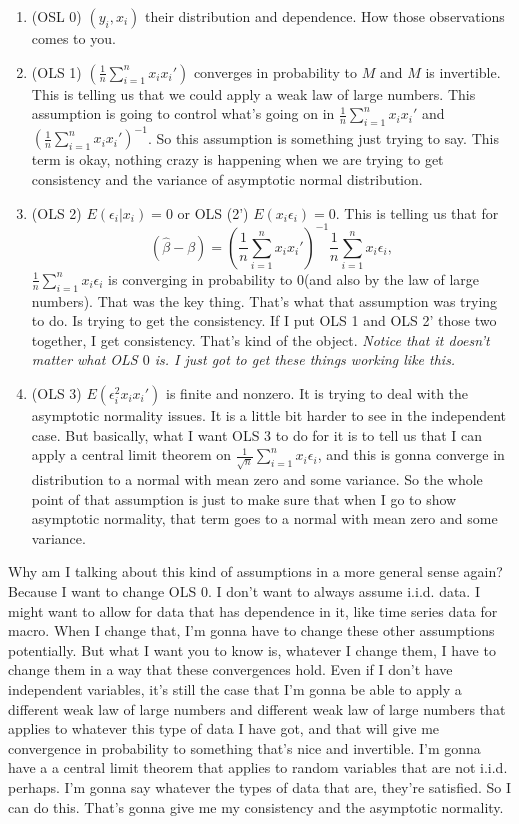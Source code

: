 \documentclass[11pt,a4paper]{amsart}
\theoremstyle{plain}
\theoremstyle{definition}
\begin{document}
	   		 \begin{enumerate}
	   		 	\item (OSL 0) $(y_{i},x_{i})$ their distribution and dependence. How those observations comes to you.
	   		 	\item (OLS 1) $(\frac{1}{n}\sum_{i=1}^{n} x_{i}x_{i}')$ converges in probability to $M$ and $M$ is invertible. This is telling us that we could apply a weak law of large numbers. This assumption is going to control what's going on in $\frac{1}{n}\sum_{i=1}^{n} x_{i}x_{i}'$ and $(\frac{1}{n}\sum_{i=1}^{n} x_{i}x_{i}')^{-1}$.  So this assumption is something just trying to say. This term is okay, nothing crazy is happening when we are trying to get consistency and the variance of asymptotic normal distribution.
	   		 	\item (OLS 2) $E(\epsilon_{i} | x_{i}) = 0$  or OLS (2') $E(x_{i}\epsilon_{i}) = 0$. This is telling us that for 
	   		 		\[ (\hat{\beta} - \beta) = (\frac{1}{n}\sum_{i=1}^{n} x_{i}x_{i}')^{-1} \frac{1}{n} \sum_{i=1}^{n} x_{i}\epsilon_{i},	\]
	   		 		$\frac{1}{n} \sum_{i=1}^{n} x_{i}\epsilon_{i}$ is converging in probability to $0$(and also by the law of large numbers). That was the key thing. That's what that assumption was trying to do. Is trying to get the consistency. If I put OLS 1 and OLS 2' those two together, I get consistency. That's kind of the object. \emph{Notice that it doesn't matter what OLS $0$ is. I just got to get these things working like this.} 
	   		 	\item (OLS 3) $E(\epsilon_{i}^{2}x_{i}x_{i}')$ is finite and nonzero. It is trying to deal with the asymptotic normality issues. It is a little bit harder to see in the independent case. But basically, what I want OLS $3$ to do for it is to tell us that I can apply a central limit theorem on $\frac{1}{\sqrt{n}} \sum_{i=1}^{n} x_{i}\epsilon_{i}$, and this is gonna converge in distribution to a normal with mean zero and some variance. So the whole point of that assumption is just to make sure that when I go to show asymptotic normality, that term goes to a normal with mean zero and some variance. 
	   		 \end{enumerate}
   		 	Why am I talking about this kind of assumptions in a more general sense again? Because I want to change OLS 0. I don't want to always assume i.i.d. data. I might want to allow for data that has dependence in it, like time series data for macro. When I change that, I'm gonna have to change these other assumptions potentially. But what I want you to know is,  whatever I change them, I have to change them in a way that these convergences hold. Even if I don't have independent variables, it's still the case that I'm gonna be able to apply a different weak law of large numbers and different weak law of large numbers that applies to whatever this type of data I have got, and that will give me convergence in probability to something that's nice and invertible. I'm gonna have a a central limit theorem that applies to random variables that are not i.i.d. perhaps. I'm gonna say whatever the types of data that are, they're satisfied. So I can do this. That's gonna give me my consistency and the asymptotic normality.\par 
\end{document}
